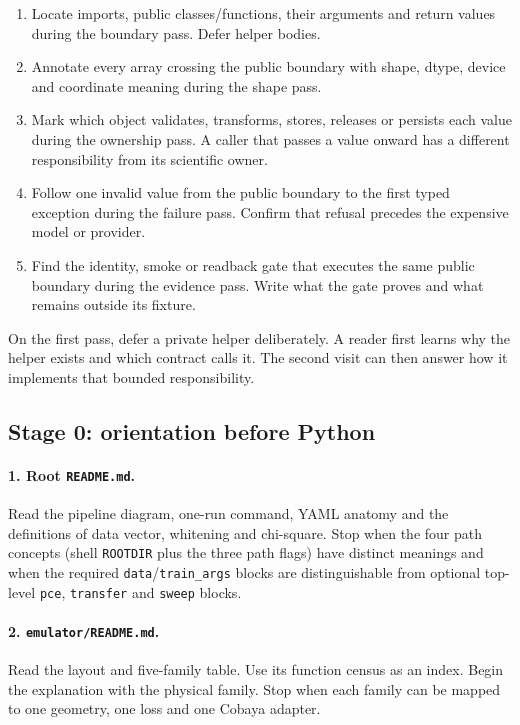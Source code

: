 \documentclass[10pt,aps,prd,twocolumn,nofootinbib]{revtex4-2}
\newcommand{\code}[1]{\texttt{#1}}
\begin{document}
\begin{enumerate}
  \item Locate imports, public classes/functions, their arguments and return
        values during the boundary pass.  Defer helper bodies.
  \item Annotate every array crossing the public boundary with shape, dtype,
        device and coordinate meaning during the shape pass.
  \item Mark which object validates, transforms, stores, releases or persists
        each value during the ownership pass.  A caller that passes a value
        onward has a different responsibility from its scientific owner.
  \item Follow one invalid value from the public boundary to the first typed
        exception during the failure pass.  Confirm that refusal precedes the
        expensive model or provider.
  \item Find the identity, smoke or readback gate that executes the same public
        boundary during the evidence pass.  Write what the gate proves and
        what remains outside its fixture.
\end{enumerate}

On the first pass, defer a private helper deliberately.  A
reader first learns why the helper exists and which contract calls it.  The
second visit can then answer how it implements that bounded responsibility.

\subsection{Stage 0: orientation before Python}

\paragraph{1.  Root \code{README.md}.}
Read the pipeline diagram, one-run command, YAML anatomy and the definitions
of data vector, whitening and chi-square.  Stop when the four path concepts
(shell \code{ROOTDIR} plus the three path flags) have distinct meanings and
when the required \code{data}/\code{train\_args} blocks are distinguishable
from optional top-level \code{pce}, \code{transfer} and \code{sweep} blocks.

\paragraph{2.  \code{emulator/README.md}.}
Read the layout and five-family table.  Use its function census as an index.
Begin the explanation with the physical family.  Stop when each family can be mapped to
one geometry, one loss and one Cobaya adapter.
\end{document}

